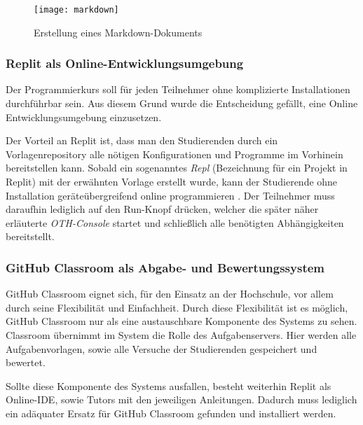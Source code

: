 \begin{figure}[H]
    \centering
    \texttt{[image: markdown]}
    \caption{Erstellung eines Markdown-Dokuments}
    \label{fig:markdown}
\end{figure}

\subsubsection{Replit als Online-Entwicklungsumgebung}
Der Programmierkurs soll für jeden Teilnehmer ohne komplizierte Installationen
durchführbar sein. Aus diesem Grund wurde die Entscheidung gefällt, eine
Online Entwicklungsumgebung einzusetzen.

Der Vorteil an Replit ist, dass man den Studierenden durch ein
Vorlagenrepository alle nötigen Konfigurationen und Programme im Vorhinein
bereitstellen kann. Sobald ein sogenanntes \emph{Repl} (Bezeichnung für
ein Projekt in Replit) mit der erwähnten Vorlage erstellt wurde, kann der
Studierende ohne Installation geräteübergreifend online programmieren
\parencite{replit-import-from-github}. Der Teilnehmer muss daraufhin lediglich
auf den \glqq Run\grqq{}-Knopf drücken, welcher die später näher erläuterte
\emph{OTH-Console} startet und schließlich alle benötigten Abhängigkeiten
bereitstellt.

\subsubsection{GitHub Classroom als Abgabe- und Bewertungssystem}
GitHub Classroom eignet sich, für den Einsatz an der Hochschule, vor allem durch
seine Flexibilität und Einfachheit. Durch diese Flexibilität ist es möglich,
GitHub Classroom nur als eine austauschbare Komponente des Systems zu sehen.
Classroom übernimmt im System die Rolle des Aufgabenservers. Hier werden alle
Aufgabenvorlagen, sowie alle Versuche der Studierenden gespeichert und bewertet.

Sollte diese Komponente des Systems ausfallen, besteht weiterhin Replit als
Online-IDE, sowie Tutors mit den jeweiligen Anleitungen. Dadurch muss lediglich
ein adäquater Ersatz für GitHub Classroom gefunden und installiert werden.